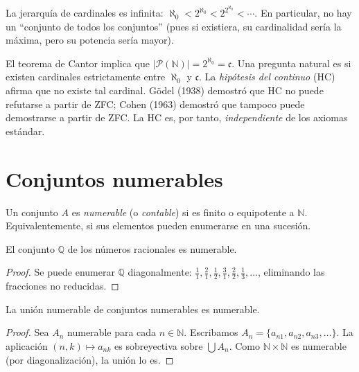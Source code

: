 \begin{corollary}
La jerarquía de cardinales es infinita: $\aleph_0 < 2^{\aleph_0} < 2^{2^{\aleph_0}} < \cdots$. En particular, no hay un ``conjunto de todos los conjuntos'' (pues si existiera, su cardinalidad sería la máxima, pero su potencia sería mayor).
\end{corollary}

\begin{remark}
El teorema de Cantor implica que $|\mathcal{P}(\mathbb{N})|=2^{\aleph_0}=\mathfrak{c}$. Una pregunta natural es si existen cardinales estrictamente entre $\aleph_0$ y $\mathfrak{c}$. La \emph{hipótesis del continuo} (HC) afirma que no existe tal cardinal. Gödel (1938) demostró que HC no puede refutarse a partir de ZFC; Cohen (1963) demostró que tampoco puede demostrarse a partir de ZFC. La HC es, por tanto, \emph{independiente} de los axiomas estándar.
\end{remark}

\section{Conjuntos numerables}

\begin{definition}
\label{def:numerable}
Un conjunto $A$ es \emph{numerable} (o \emph{contable}) si es finito o equipotente a $\mathbb{N}$. Equivalentemente, si sus elementos pueden enumerarse en una sucesión.
\end{definition}

\begin{theorem}
\label{teo:q-numerable}
El conjunto $\mathbb{Q}$ de los números racionales es numerable.
\end{theorem}
\begin{proof}
Se puede enumerar $\mathbb{Q}$ diagonalmente: $\frac{1}{1},\frac{2}{1},\frac{1}{2},\frac{3}{1},\frac{2}{2},\frac{1}{3},\dots$, eliminando las fracciones no reducidas.
\end{proof}

\begin{theorem}
\label{teo:union-numerable}
La unión numerable de conjuntos numerables es numerable.
\end{theorem}

\begin{proof}
Sea $A_n$ numerable para cada $n\in\mathbb{N}$. Escribamos $A_n=\{a_{n1},a_{n2},a_{n3},\dots\}$. La aplicación $(n,k)\mapsto a_{nk}$ es sobreyectiva sobre $\bigcup A_n$. Como $\mathbb{N}\times\mathbb{N}$ es numerable (por diagonalización), la unión lo es.
\end{proof}


